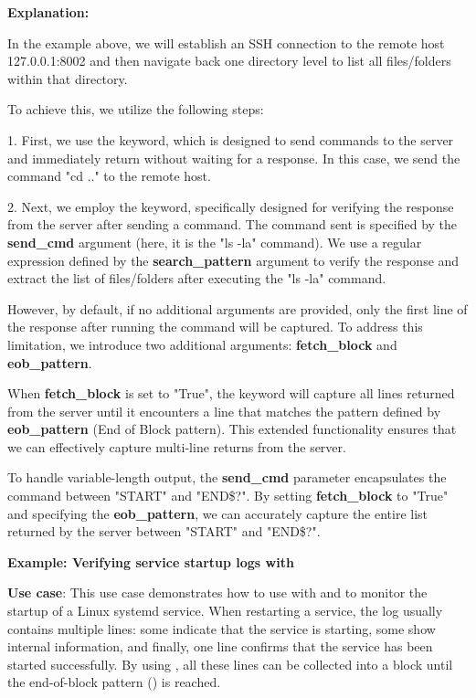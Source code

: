 \textbf{Explanation:}

In the example above, we will establish an SSH connection to the remote host 127.0.0.1:8002 and then navigate back one directory level to list all files/folders within that directory.

To achieve this, we utilize the following steps:

1. First, we use the  keyword, which is designed to send commands to the server and immediately return without waiting for a response. In this case, we send the command "cd .." to the remote host.

2. Next, we employ the  keyword, specifically designed for verifying the response from the server after sending a command. The command sent is specified by the \textbf{send\_cmd} argument (here, it is the "ls -la" command). We use a regular expression defined by the \textbf{search\_pattern} argument to verify the response and extract the list of files/folders after executing the "ls -la" command.

However, by default, if no additional arguments are provided, only the first line of the response after running the command will be captured. To address this limitation, we introduce two additional arguments: \textbf{fetch\_block} and \textbf{eob\_pattern}.

When \textbf{fetch\_block} is set to "True", the  keyword will capture all lines returned from the server until it encounters a line that matches the pattern defined by \textbf{eob\_pattern} (End of Block pattern). This extended functionality ensures that we can effectively capture multi-line returns from the server.

To handle variable-length output, the \textbf{send\_cmd} parameter encapsulates the command between "START" and "END\$?". By setting \textbf{fetch\_block} to "True" and specifying the \textbf{eob\_pattern}, we can accurately capture the entire list returned by the server between "START" and "END\$?".

\textbf{Example: Verifying service startup logs with }

\textbf{Use case}:
This use case demonstrates how to use  with  and  to monitor the startup of a Linux systemd service.
When restarting a service, the log usually contains multiple lines: some indicate that the service is starting, some show internal information, and finally, one line confirms that the service has been started successfully.
By using , all these lines can be collected into a block until the end-of-block pattern () is reached.

